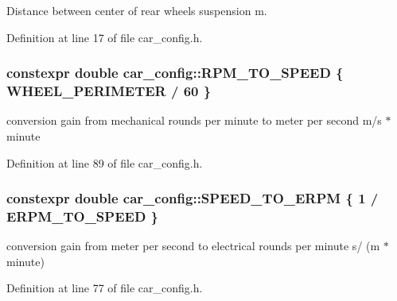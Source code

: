Distance between center of rear wheels suspension  m. 



Definition at line 17 of file car\+\_\+config.\+h.

\subsubsection[{\texorpdfstring{R\+P\+M\+\_\+\+T\+O\+\_\+\+S\+P\+E\+ED}{RPM_TO_SPEED}}]{\setlength{\rightskip}{0pt plus 5cm}constexpr double car\+\_\+config\+::\+R\+P\+M\+\_\+\+T\+O\+\_\+\+S\+P\+E\+ED \{ {\bf W\+H\+E\+E\+L\+\_\+\+P\+E\+R\+I\+M\+E\+T\+ER} / 60 \}}\hypertarget{namespacecar__config_aee034b6adfd7932f245bc94d869f2bb6}{}\label{namespacecar__config_aee034b6adfd7932f245bc94d869f2bb6}


conversion gain from mechanical rounds per minute to meter per second  m/s $\ast$ minute 



Definition at line 89 of file car\+\_\+config.\+h.

\subsubsection[{\texorpdfstring{S\+P\+E\+E\+D\+\_\+\+T\+O\+\_\+\+E\+R\+PM}{SPEED_TO_ERPM}}]{\setlength{\rightskip}{0pt plus 5cm}constexpr double car\+\_\+config\+::\+S\+P\+E\+E\+D\+\_\+\+T\+O\+\_\+\+E\+R\+PM \{ 1 / {\bf E\+R\+P\+M\+\_\+\+T\+O\+\_\+\+S\+P\+E\+ED} \}}\hypertarget{namespacecar__config_a0f37aa7e52366aebb006c6e1d3317900}{}\label{namespacecar__config_a0f37aa7e52366aebb006c6e1d3317900}


conversion gain from meter per second to electrical rounds per minute  s/ (m $\ast$ minute) 



Definition at line 77 of file car\+\_\+config.\+h.

